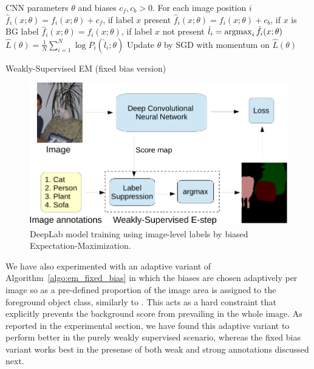 \begin{algorithm}[!htbp]
  \centering
  \begin{algorithmic}[1]
    \algrenewcommand{}
    \Require CNN parameters $\theta$ and biases $c_f, c_b > 0$.
    \algrenewcommand{}
    \Require For each image position $i$
    \State $\hat{f}_i (x; \theta) = f_i(x; \theta) + c_f$, if label $x$ present 
    \State $\hat{f}_i (x; \theta) = f_i(x; \theta) + c_b$, if $x$ is BG label 
    \State $\hat{f}_i (x; \theta) = f_i(x; \theta)$, if label $x$ not present
    \State $\hat{l}_i = \mathop{\mathrm{argmax}}_i \hat{f}_i (x; \theta)$ 
    \algrenewcommand{}
    \Require
    \State $\hat{L}(\theta) = \frac{1}{N} \sum_{i = 1}^N \log P_i(\hat{l}_i; \theta)$ 
    \State Update $\theta$ by SGD with momentum on $\hat{L}(\theta)$
    \end{algorithmic}
  \caption{Weakly-Supervised EM (fixed bias version)}
  \label{algo:em_fixed_bias}
\end{algorithm}

\begin{figure}[htbp!]
  \centering
  \includegraphics[width=0.9\linewidth]{fig/model_train_image.pdf} 
  \caption{DeepLab model training using image-level labels by
    biased Expectation-Maximization.}
  \label{fig:model_train_image}
\end{figure}

We have also experimented with an adaptive variant of
Algorithm~\ref{algo:em_fixed_bias} in which the biases are chosen
adaptively per image so as a pre-defined proportion of the image area
is assigned to the foreground object class, similarly to
\citet{kuck2005individuals}. This acts as a hard constraint that
explicitly prevents the background score from prevailing in the whole
image. As reported in the experimental section, we have found this
adaptive variant to perform better in the purely weakly supervised
scenario, whereas the fixed bias variant works best in the presense of
both weak and strong annotations discussed next.

